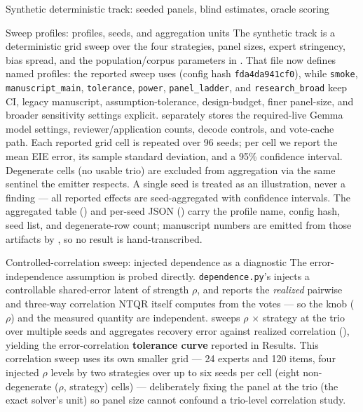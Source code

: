 \documentclass[
  ignorenonframetext,
]{beamer}
\begin{document}
\begin{frame}{Synthetic deterministic track:
seeded panels, blind estimates, oracle scoring}
\begin{block}{Sweep profiles: profiles, seeds, and aggregation units}
\protect{}\label{sweep-profiles-profiles-seeds-and-aggregation-units}
The synthetic track is a deterministic grid sweep over the four
strategies, panel sizes, expert stringency, bias spread, and the
population/corpus parameters in . That
file now defines named profiles: the reported sweep uses
 (config hash \texttt{fda4da941cf0}), while
\texttt{smoke}, \texttt{manuscript\_main}, \texttt{tolerance},
\texttt{power}, \texttt{panel\_ladder}, and \texttt{research\_broad}
keep CI, legacy manuscript, assumption-tolerance, design-budget, finer
panel-size, and broader sensitivity settings explicit.
 separately stores the required-live Gemma
model settings, reviewer/application counts, decode controls, and
vote-cache path. Each reported grid cell is repeated over 96 seeds; per
cell we report the mean EIE error, its sample standard deviation, and a
95\% confidence interval. Degenerate cells (no usable trio) are excluded
from aggregation via the same sentinel the emitter respects. A single
seed is treated as an illustration, never a finding --- all reported
effects are seed-aggregated with confidence intervals. The aggregated
table () and per-seed JSON
() carry the profile name,
config hash, seed list, and degenerate-row count; manuscript numbers are
emitted from those artifacts by
, so no result is
hand-transcribed.
\end{block}

\begin{block}{Controlled-correlation sweep: injected dependence as a
diagnostic}
\protect{}\label{controlled-correlation-sweep-injected-dependence-as-a-diagnostic}
The error-independence assumption is probed directly.
\texttt{dependence.py}'s
injects a controllable shared-error latent of strength \(\rho\), and
 reports the \emph{realized}
pairwise and three-way correlation NTQR itself computes from the votes
--- so the knob (\(\rho\)) and the measured quantity are independent.
 sweeps \(\rho\) × strategy at the trio
over multiple seeds and aggregates recovery error against realized
correlation (), yielding the
error-correlation \textbf{tolerance curve} reported in Results. This
correlation sweep uses its own smaller grid --- 24 experts and 120
items, four injected \(\rho\) levels by two strategies over up to six
seeds per cell (eight non-degenerate (\(\rho\), strategy) cells) ---
deliberately fixing the panel at the trio (the exact solver's unit) so
panel size cannot confound a trio-level correlation study.
\end{block}


\end{frame}
\end{document}
